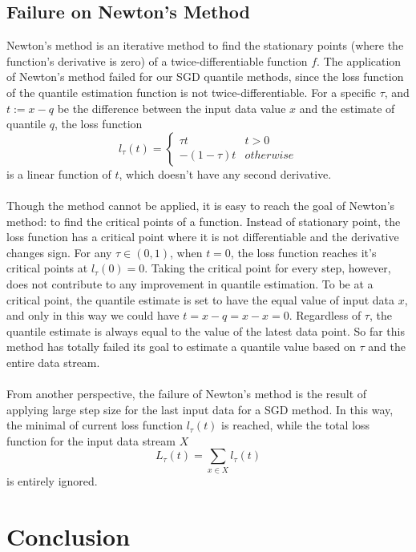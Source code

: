 \documentclass[12pt]{article}
\begin{document}
\subsection{Failure on Newton's Method}
Newton's method is an iterative method to find the stationary points (where the function's derivative is zero) of a twice-differentiable function $f$. The application of Newton's method failed for our SGD quantile methods, since the loss function of the quantile estimation function is not twice-differentiable. For a specific $\tau$, and $t := x - q$ be the difference between the input data value $x$ and the estimate of quantile $q$, the loss function 
$$
l_\tau(t)= 
    \begin{cases}
        \tau t & t > 0\\
        -(1-\tau) t & otherwise
    \end{cases}
$$
is a linear function of $t$, which doesn't have any second derivative. 
\\\\
Though the method cannot be applied, it is easy to reach the goal of Newton's method: to find the critical points of a function. Instead of stationary point, the loss function has a critical point where it is not differentiable and the derivative changes sign. For any $\tau \in (0,1)$, when $t=0$, the loss function reaches it's critical points at $l_\tau(0) = 0$. Taking the critical point for every step, however, does not contribute to any improvement in quantile estimation. To be at a critical point, the quantile estimate is set to have the equal value of input data $x$, and only in this way we could have $t = x-q = x-x = 0$. Regardless of $\tau$, the quantile estimate is always equal to the value of the latest data point. So far this method has totally failed its goal to estimate a quantile value based on $\tau$ and the entire data stream.
\\\\
From another perspective, the failure of Newton's method is the result of applying large step size for the last input data for a SGD method. In this way, the minimal of current loss function $l_\tau(t)$ is reached, while the total loss function for the input data stream $X$
$$
L_{\tau}(t) = \sum_{x \in X} l_{\tau}(t)
$$
is entirely ignored.
\section{Conclusion}
\end{document}
